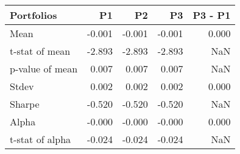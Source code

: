 \begin{tabular}{lrrrr}
\toprule
Portfolios & P1 & P2 & P3 & P3 - P1 \\
\midrule
Mean & -0.001 & -0.001 & -0.001 & 0.000 \\
t-stat of mean & -2.893 & -2.893 & -2.893 & NaN \\
p-value of mean & 0.007 & 0.007 & 0.007 & NaN \\
Stdev & 0.002 & 0.002 & 0.002 & 0.000 \\
Sharpe & -0.520 & -0.520 & -0.520 & NaN \\
Alpha & -0.000 & -0.000 & -0.000 & 0.000 \\
t-stat of alpha & -0.024 & -0.024 & -0.024 & NaN \\
\bottomrule
\end{tabular}
